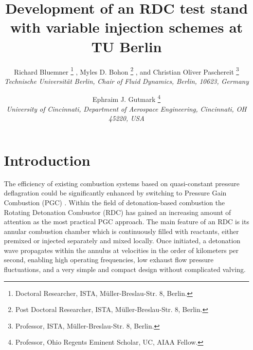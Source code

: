 \documentclass[]{aiaa-tc}%
\title{Development of an RDC test stand with variable injection schemes at TU Berlin}
\author{
  Richard Bluemner%
    \thanks{Doctoral Researcher, ISTA, Müller-Breslau-Str. 8, Berlin.}
  , Myles D. Bohon%
  	\thanks{Post Doctoral Researcher, ISTA, Müller-Breslau-Str. 8, Berlin.}
  , and Christian Oliver Paschereit%
  \thanks{Professor, ISTA, Müller-Breslau-Str. 8, Berlin.}\\
  {\normalsize\itshape
   Technische Universität Berlin, Chair of Fluid Dynamics, Berlin, 10623, Germany}
  \and
  Ephraim J. Gutmark%
   \thanks{Professor, Ohio Regents Eminent Scholar, UC, AIAA Fellow.}\\
  {\normalsize\itshape
  University of Cincinnati, Department of Aerospace Engineering, Cincinnati, OH 45220, USA}
 }
\begin{document}
\maketitle



\section{Introduction}
The efficiency of existing combustion systems based on quasi-constant pressure deflagration could be significantly enhanced by switching to Pressure Gain Combustion (PGC) \cite{Jones2013}. Within the field of detonation-based combustion the Rotating Detonation Combustor (RDC) has gained an increasing amount of attention as the most practical PGC approach. The main feature of an RDC is its annular combustion chamber which is continuously filled with reactants, either premixed or injected separately and mixed locally. Once initiated, a detonation wave propagates within the annulus at velocities in the order of kilometers per second, enabling high operating frequencies, low exhaust flow pressure fluctuations, and a very simple and compact design without complicated valving. 
\end{document}
